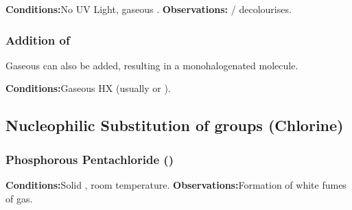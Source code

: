 				\vspace{1.5em}
				\vbox{\textbf{Conditions:}\tabto{35mm}No UV Light, gaseous .}
				\vbox{\textbf{Observations:}\tabto{35mm}  /   decolourises.}


			\subsubsection{Addition of }

				Gaseous  can also be added, resulting in a monohalogenated molecule.

				\vspace{1.5em}
				\vbox{\textbf{Conditions:}\tabto{35mm}Gaseous HX (usually  or ).}


		\pagebreak
		\hypertarget{NSubAlcohols}{}
		\subsection{Nucleophilic Substitution of  groups (Chlorine)}

			\subsubsection{Phosphorous Pentachloride ()}

				\vspace{1.5em}
				\vbox{\textbf{Conditions:}\tabto{35mm}Solid , room temperature.}
				\vbox{\textbf{Observations:}\tabto{35mm}Formation of white fumes of  gas.}

